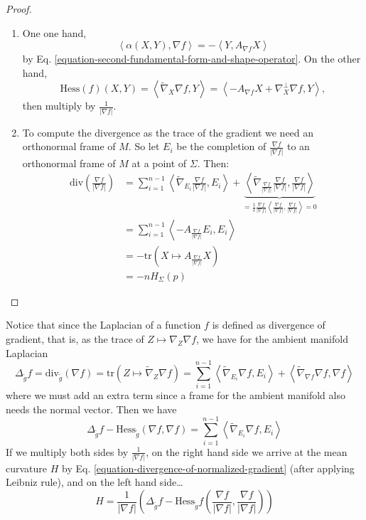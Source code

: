 \begin{proof}
\begin{enumerate}
\item One one hand,
 $$
\left<\alpha(X,Y),\nabla f\right>=-\left<Y,A_{\nabla f}X\right>
$$
by Eq. \ref{equation-second-fundamental-form-and-shape-operator}.
On the other hand,
$$
\text{Hess}(f)(X,Y)=\left<\tilde{\nabla}_X \nabla f,Y\right>=
\left<-A_{\nabla f}X+\nabla_X^\perp \nabla f,Y\right>,
$$
then multiply by $\frac{1}{|\nabla f|}$.

\item To compute the divergence as the trace of the gradient we need an
orthonormal frame of $M$. So let $E_i$ be the completion of 
$\frac{\nabla f}{|\nabla f|}$ to an orthonormal frame of $M$ at a point of
$\Sigma$. Then:
\begin{equation}
\begin{aligned}
\text{div}\left(\frac{\nabla f}{|\nabla f|}\right)
&=\sum_{i=1}^{n-1}
\left<\tilde{\nabla}_{E_i}\frac{\nabla f}{|\nabla f|},E_i\right>
+\underbrace{\left<\tilde{\nabla}_{\frac{\nabla f}{|\nabla f|}}
\frac{\nabla f}{|\nabla f|},\frac{\nabla f}{|\nabla f|}\right>}
_{=\frac{1}{2}\frac{\nabla f}{|\nabla f|}
\left<\frac{\nabla f}{|\nabla f|},\frac{\nabla f}{|\nabla f|}\right>=0}
\label{equation-divergence-of-normalized-gradient}\\
&=\sum_{i=1}^{n-1} \left<-A_{\frac{\nabla f}{|\nabla f|}}E_i,E_i\right>\\
&=-\text{tr}\left(X \mapsto A_{\frac{\nabla f}{|\nabla f|}}X\right)\\
&=-nH_{\Sigma}(p)
\end{aligned}
\end{equation}
\end{enumerate}
\end{proof}

Notice that since the Laplacian of a function $f$ is defined as divergence of
gradient, that is, as the trace of $Z\mapsto \nabla_Z\nabla f$, 
we have for the ambient manifold Laplacian
\begin{equation}
\label{equation-immersion-Laplacian}
\Delta_{\tilde{g}} f=\text{div}_{\tilde{g}}(\nabla f)
=\text{tr}(Z \mapsto \tilde{\nabla}_Z\nabla f)
=\sum_{i=1}^{n-1}\left<\tilde{\nabla}_{E_i}\nabla f,E_i\right>
+\left<\tilde{\nabla}_{\nabla f}\nabla f,\nabla f\right>
\end{equation}
where we must add an extra term since a frame for the ambient manifold
also needs the normal vector. Then we have
$$
\Delta_{\tilde{g}}f-\text{Hess}_{\tilde{g}}(\nabla f,\nabla f)
=\sum_{i=1}^{n-1}\left<\tilde{\nabla}_{E_i}\nabla f,E_i\right>
$$
If we multiply both sides by $\frac{1}{|\nabla f|}$, on the right hand side we
arrive at the mean curvature $H$ by Eq.
\ref{equation-divergence-of-normalized-gradient} (after applying Leibniz rule),
 and on the left hand side…
\begin{equation}
\label{equation-mean-curvature-for-level-sets}
H=\frac{1}{|\nabla f|}\left(\Delta_{\tilde{g}} f-\text{Hess}_{\tilde{g}}f
\left(\frac{\nabla f}{|\nabla f|},\frac{\nabla f}{|\nabla f|}\right)\right)
\end{equation}

